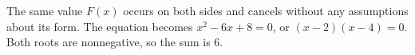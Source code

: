 The same value $F(x)$ occurs on both sides and cancels without any assumptions about its form. The equation becomes $x^2-6x+8=0$, or $(x-2)(x-4)=0$. Both roots are nonnegative, so the sum is $\boxed6$.
